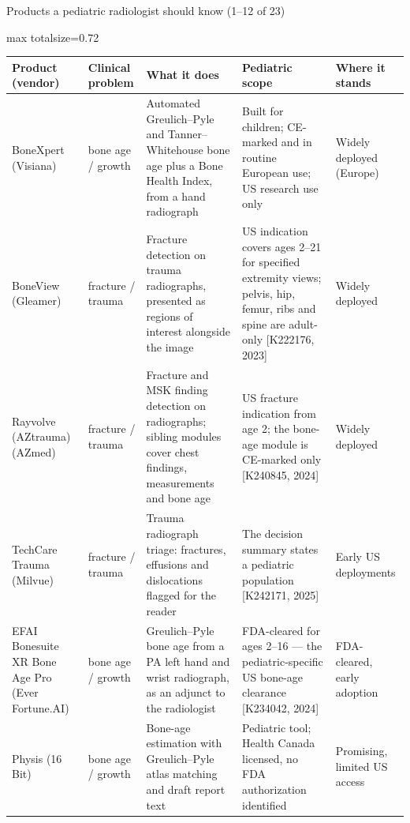 \documentclass[aspectratio=169]{beamer}
\renewcommand{\arraystretch}{1.08}
\begin{document}
\begin{frame}[category=Commercial Software]{Products a pediatric radiologist should know (1--12 of 23)}
\tiny
\begin{adjustbox}{max totalsize={\textwidth}{0.72\textheight}}
\renewcommand{\arraystretch}{1.2}
\begin{tabular}{|>{\raggedright\arraybackslash}p{}|>{\raggedright\arraybackslash}p{}|>{\raggedright\arraybackslash}p{}|>{\raggedright\arraybackslash}p{}|>{\raggedright\arraybackslash}p{}|}
\hline \textbf{Product (vendor)} & \textbf{Clinical problem} & \textbf{What it does} & \textbf{Pediatric scope} & \textbf{Where it stands} \\ \hline
BoneXpert (Visiana) & bone age / growth & Automated Greulich--Pyle and Tanner--Whitehouse bone age plus a Bone Health Index, from a hand radiograph & Built for children; CE-marked and in routine European use; US research use only & Widely deployed (Europe) \\ \hline
BoneView (Gleamer) & fracture / trauma & Fracture detection on trauma radiographs, presented as regions of interest alongside the image & US indication covers ages 2--21 for specified extremity views; pelvis, hip, femur, ribs and spine are adult-only [K222176, 2023] & Widely deployed \\ \hline
Rayvolve (AZtrauma) (AZmed) & fracture / trauma & Fracture and MSK finding detection on radiographs; sibling modules cover chest findings, measurements and bone age & US fracture indication from age 2; the bone-age module is CE-marked only [K240845, 2024] & Widely deployed \\ \hline
TechCare Trauma (Milvue) & fracture / trauma & Trauma radiograph triage: fractures, effusions and dislocations flagged for the reader & The decision summary states a pediatric population [K242171, 2025] & Early US deployments \\ \hline
EFAI Bonesuite XR Bone Age Pro (Ever Fortune.AI) & bone age / growth & Greulich--Pyle bone age from a PA left hand and wrist radiograph, as an adjunct to the radiologist & FDA-cleared for ages 2--16 --- the pediatric-specific US bone-age clearance [K234042, 2024] & FDA-cleared, early adoption \\ \hline
Physis (16 Bit) & bone age / growth & Bone-age estimation with Greulich--Pyle atlas matching and draft report text & Pediatric tool; Health Canada licensed, no FDA authorization identified & Promising, limited US access \\ \hline

\end{tabular}
\end{adjustbox}
\end{frame}
\end{document}
